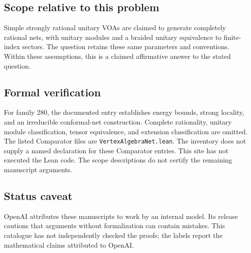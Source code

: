 \documentclass[11pt]{article}
\begin{document}
\subsection{Scope relative to this problem}
Simple strongly rational unitary VOAs are claimed to generate completely rational nets, with unitary modules and a braided unitary equivalence to finite-index sectors. The question retains these same parameters and conventions. Within these assumptions, this is a claimed affirmative answer to the stated question.

\subsection{Formal verification}
For family 280, the documented entry establishes energy bounds, strong locality, and an irreducible conformal-net construction. Complete rationality, unitary module classification, tensor equivalence, and extension classification are omitted. The listed Comparator files are \texttt{VertexAlgebraNet.lean}. The inventory does not supply a named declaration for these Comparator entries. This site has not executed the Lean code. The scope descriptions do not certify the remaining manuscript arguments.

\subsection{Status caveat}
OpenAI attributes these manuscripts to work by an internal model. Its release cautions that arguments without formalization can contain mistakes. This catalogue has not independently checked the proofs; the labels report the mathematical claims attributed to OpenAI.
\end{document}
